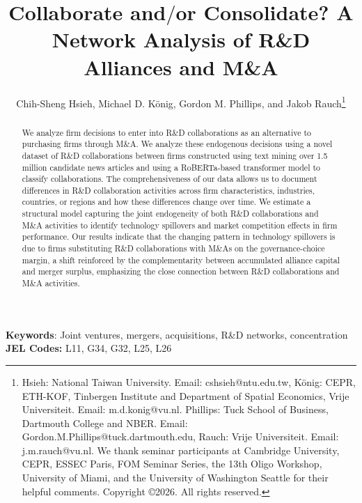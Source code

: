 \documentclass[12pt]{article}
\begin{document}
\begin{titlepage}
\title{\textbf{Collaborate and$/$or Consolidate? A Network Analysis of R\&D Alliances and M\&A}}
\author{Chih-Sheng Hsieh, Michael D. K{\"o}nig, Gordon M. Phillips, and Jakob Rauch\thanks{Hsieh: National Taiwan University. Email: cshsieh@ntu.edu.tw, K{\"o}nig:  CEPR, ETH-KOF, Tinbergen Institute and Department of Spatial Economics, Vrije Universiteit. Email: m.d.konig@vu.nl. Phillips: Tuck School of Business, Dartmouth College and NBER. Email: Gordon.M.Phillips@tuck.dartmouth.edu, Rauch: Vrije Universiteit. Email: j.m.rauch@vu.nl. We thank seminar participants at Cambridge University, CEPR, ESSEC Paris, FOM Seminar Series, the 13th Oligo Workshop, University of Miami, and the University of Washington Seattle for their helpful comments.  
Copyright \copyright 2026.  All rights reserved.}}
\thispagestyle{empty}
\renewcommand{\baselinestretch}{1}
\maketitle
\begin{abstract} 
We analyze firm decisions to enter into R\&D collaborations as an alternative to purchasing firms through M\&A.   We analyze these endogenous decisions using a novel dataset of R\&D collaborations between firms constructed using text mining over 1.5 million candidate news articles and using a RoBERTa-based transformer model to classify collaborations.  The comprehensiveness of our data allows us to document differences in R\&D collaboration activities across firm characteristics, industries, countries, or regions and how these differences change over time. We estimate a structural model capturing the joint endogeneity of both R\&D collaborations and M\&A activities to identify technology spillovers and market competition effects in firm performance. Our results indicate that the changing pattern in technology spillovers is due to firms substituting R\&D collaborations with M\&As on the governance-choice margin, a shift reinforced by the complementarity between accumulated alliance capital and merger surplus, emphasizing the close connection between R\&D collaborations and M\&A activities.
\end{abstract}
\vspace{0.1cm}
\noindent \textbf{Keywords}: Joint ventures, mergers, acquisitions, R\&D  networks, concentration \\
\noindent \textbf{JEL Codes:} L11, G34, G32, L25, L26

\bigskip
\setcounter{page}{0}
\setcounter{section}{0}
\thispagestyle{empty}
\end{titlepage}
\pagebreak \newpage
\end{document}
